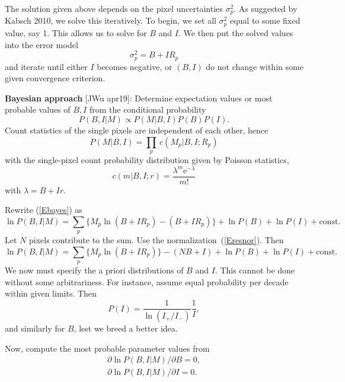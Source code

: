 \documentclass[11pt,a4paper]{article}
\begin{document}
The solution given above depends on the pixel uncertainties $\sigma_p^2$. As suggested by Kabsch 2010, we solve this iteratively. To begin, we set all $\sigma^2_p$ equal to some fixed value, say 1. This allows us to solve for $B$ and $I$. We then put the solved values into the error model
\begin{equation} \sigma_p^2 = B + I R_p \end{equation}
and iterate until either $I$ becomes negative, or $(B, I)$ do not change within some given convergence criterion.

\textbf{Bayesian approach} [JWu apr19]:
Determine expectation values or most probable values of $B,I$ from the conditional probability
\begin{equation}\label{Ebayes}
  P(B,I|M) \propto P(M|B,I) P(B) P(I).
\end{equation}
Count statistics of the single pixels are independent of each other, hence
\begin{equation}\label{Ec2p}
  P(M|B,I) = \prod_p\, c(M_p|B,I;R_p)
\end{equation}
with the single-pixel count probability distribution given by Poisson statistics,
\begin{equation}
  c(m|B,I;r) = \frac{\lambda^m{\mathrm e}^{-\lambda}}{m!}
\end{equation}
with $\lambda=B+Ir$.

Rewrite (\ref{Ebayes}) as
\begin{equation}
  \ln P(B,I|M) = \sum_p\Big\{M_p\ln(B+IR_p)-(B+IR_p)\Big\} +\ln P(B) + \ln P(I) + \mathrm{const}.
\end{equation}
Let $N$ pixels contribute to the sum.
Use the normalization~(\ref{Eresnor}).
Then
\begin{equation}
  \ln P(B,I|M) = \sum_p\Big\{M_p\ln(B+IR_p)\Big\}-(NB+I) +\ln P(B) + \ln P(I) + \mathrm{const}.
\end{equation}
We now must specify the a priori distributions of $B$ and $I$.
This cannot be done without some arbitrariness.
For instance, assume equal probability per decade within given limits.
Then
\begin{equation}
  P(I) = \frac{1}{\ln(I_{+}/I_{-})} \frac{1}{I},
\end{equation}
and similarly for $B$, lest we breed a better idea.

Now, compute the most probable parameter values from
\begin{equation}
  \begin{array}{l}
  \partial \ln P(B,I|M) / \partial B = 0, \\[1.2ex]
  \partial \ln P(B,I|M) / \partial I = 0.
  \end{array}
\end{equation}
\end{document}
